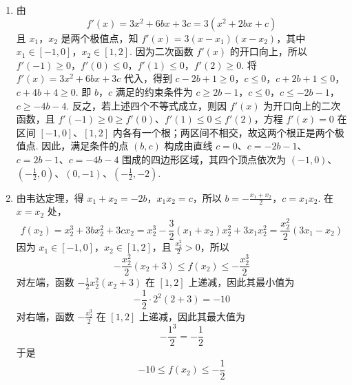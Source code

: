 \begin{solution}
\begin{enumerate}
\item 由
\[
f'(x)=3x^2+6bx+3c=3\left(x^2+2bx+c\right)
\]
且 \(x_1\)，\(x_2\) 是两个极值点，知 \(f'(x)=3\left(x-x_1\right)\left(x-x_2\right)\)，其中 \(x_1\in[-1,0]\)，\(x_2\in[1,2]\).
因为二次函数 \(f'(x)\) 的开口向上，所以 \(f'(-1)\geqslant0\)，\(f'(0)\leqslant0\)，\(f'(1)\leqslant0\)，\(f'(2)\geqslant0\). 将 \(f'(x)=3x^2+6bx+3c\) 代入，得到 \(c-2b+1\geqslant0\)，\(c\leqslant0\)，\(c+2b+1\leqslant0\)，\(c+4b+4\geqslant0\).
即 \(b\)，\(c\) 满足的约束条件为 \(c\geqslant2b-1\)，\(c\leqslant0\)，\(c\leqslant-2b-1\)，\(c\geqslant-4b-4\).
反之，若上述四个不等式成立，则因 \(f'(x)\) 为开口向上的二次函数，且 \(f'(-1)\geqslant0\geqslant f'(0)\)、\(f'(1)\leqslant0\leqslant f'(2)\)，方程 \(f'(x)=0\) 在区间 \([-1,0]\)、\([1,2]\) 内各有一个根；两区间不相交，故这两个根正是两个极值点. 因此，满足条件的点 \((b,c)\) 构成由直线 \(c=0\)、\(c=-2b-1\)、\(c=2b-1\)、\(c=-4b-4\) 围成的四边形区域，其四个顶点依次为 \((-1,0)\)、\(\left(-\frac{1}{2},0\right)\)、\((0,-1)\)、\(\left(-\frac{1}{2},-2\right)\).

\item 由韦达定理，得 \(x_1+x_2=-2b\)，\(x_1x_2=c\)，所以 \(b=-\frac{x_1+x_2}{2}\)，\(c=x_1x_2\).
在 \(x=x_2\) 处，
\[
f(x_2)=x_2^3+3bx_2^2+3cx_2
=x_2^3-\frac{3}{2}(x_1+x_2)x_2^2+3x_1x_2^2
=\frac{x_2^2}{2}\left(3x_1-x_2\right)
\]
因为 \(x_1\in[-1,0]\)，\(x_2\in[1,2]\)，且 \(\frac{x_2^2}{2}>0\)，所以
\[
-\frac{x_2^2}{2}\left(x_2+3\right)
\leqslant f(x_2)
\leqslant -\frac{x_2^3}{2}
\]
对左端，函数 \(-\frac{1}{2}x_2^2\left(x_2+3\right)\) 在 \([1,2]\) 上递减，因此其最小值为
\[
-\frac{1}{2}\cdot2^2\left(2+3\right)=-10
\]
对右端，函数 \(-\frac{x_2^3}{2}\) 在 \([1,2]\) 上递减，因此其最大值为
\[
-\frac{1^3}{2}=-\frac{1}{2}
\]
于是
\[
-10\leqslant f(x_2)\leqslant-\frac{1}{2}
\]
\end{enumerate}
\end{solution}
